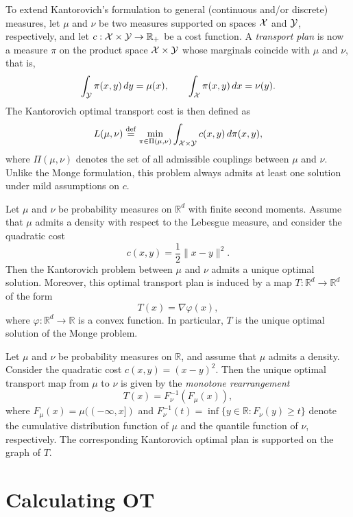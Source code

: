 To extend Kantorovich's formulation to general (continuous and/or discrete)
measures, let \(\mu\) and \(\nu\) be two measures supported on spaces \({\mathcal X}\) and
\({\mathcal Y}\), respectively, and let \(c:{\mathcal X}\times{\mathcal Y}\to{\mathbb R}_+\) be a cost function. A
\emph{transport plan} is now a measure \(\pi\) on the product space
\({\mathcal X}\times{\mathcal Y}\) whose marginals coincide with \(\mu\) and \(\nu\), that is,
\[
\int_{{\mathcal Y}} \pi(x,y)\,dy = \mu(x),
\qquad
\int_{{\mathcal X}} \pi(x,y)\,dx = \nu(y).
\]
The Kantorovich optimal transport cost is then defined as
\begin{equation}\label{eq:kantorovich_continuous}
    L(\mu,\nu)
\mathrel{\stackrel{\mathrm{def}}{=}}
\min_{\pi\in\Pi(\mu,\nu)}
\int_{{\mathcal X}\times{\mathcal Y}} c(x,y)\, d\pi(x,y),
\end{equation}
where \(\Pi(\mu,\nu)\) denotes the set of all admissible couplings between \(\mu\)
and \(\nu\). Unlike the Monge formulation, this problem always admits at least one
solution under mild assumptions on \(c\).


\begin{theorem}[Brenier]
Let $\mu$ and $\nu$ be probability measures on $\mathbb{R}^d$ with finite second
moments. Assume that $\mu$ admits a density with respect to the Lebesgue measure,
and consider the quadratic cost
\[
c(x,y) = \frac{1}{2}\|x-y\|^2.
\]
Then the Kantorovich problem between $\mu$ and $\nu$ admits a unique optimal
solution. Moreover, this optimal transport plan is induced by a map
$T:\mathbb{R}^d \to \mathbb{R}^d$ of the form
\[
T(x) = \nabla \varphi(x),
\]
where $\varphi:\mathbb{R}^d \to \mathbb{R}$ is a convex function. In particular,
$T$ is the unique optimal solution of the Monge problem.
\end{theorem}

\begin{corollary}
Let $\mu$ and $\nu$ be probability measures on $\mathbb{R}$, and assume that
$\mu$ admits a density. Consider the quadratic cost $c(x,y) = (x-y)^2$.
Then the unique optimal transport map from $\mu$ to $\nu$ is given by the
\emph{monotone rearrangement}
\[
T(x) = F_\nu^{-1}(F_\mu(x)),
\]
where $F_\mu(x) = \mu((-\infty,x])$ and $F_\nu^{-1}(t) = \inf\{y\in\mathbb{R} : F_\nu(y)\ge t\}$
denote the cumulative distribution function of $\mu$ and the quantile function
of $\nu$, respectively. The corresponding Kantorovich optimal plan is supported
on the graph of $T$.
\end{corollary}



\section{Calculating OT}

